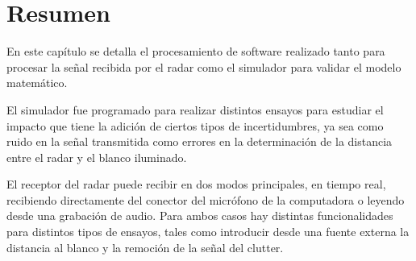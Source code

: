 \section{Resumen}

En este capítulo se detalla el procesamiento de software realizado tanto para procesar la señal recibida por el radar como el simulador para validar el modelo matemático.

El simulador fue programado para realizar distintos ensayos para estudiar el impacto que tiene la adición de ciertos tipos de incertidumbres, ya sea como ruido en la señal transmitida como errores en la determinación de la distancia entre el radar y el blanco iluminado.

El receptor del radar puede recibir en dos modos principales, en tiempo real, recibiendo directamente del conector del micrófono de la computadora o leyendo desde una grabación de audio. Para ambos casos hay distintas funcionalidades para distintos tipos de ensayos, tales como introducir desde una fuente externa la distancia al blanco y la remoción de la señal del clutter.